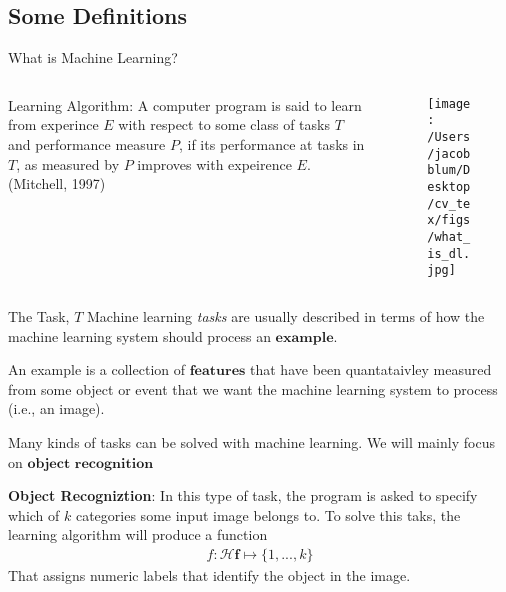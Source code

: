 \documentclass{beamer}
\begin{document}
\subsection{Some Definitions}
\begin{frame}[plain]{What is Machine Learning?}
    \begin{columns}
        \begin{column}{0.45\textwidth}
            \begin{definition}{Learning Algorithm:}
                A computer program is said to learn from experince $E$ with respect to some class of tasks $T$ and performance measure $P$, 
                if its performance at tasks in $T$, as measured by $P$ improves with expeirence $E$. (Mitchell, 1997)
            \end{definition}
            
        \end{column}
        \begin{column}{0.45\textwidth}  
            \begin{figure}
                \centering
                    \texttt{[image: /Users/jacobblum/Desktop/cv\_tex/figs/what\_is\_dl.jpg]}
                \end{figure}
        \end{column}
        \end{columns}
\end{frame}

\begin{frame}[plain]{The Task, $T$}
    Machine learning \textit{tasks} are usually described in terms of how the machine learning system should process an $\textbf{example}$. 
    
    \begin{definition}
    An example is a collection of $\textbf{features}$ that have been quantataivley measured from some object or event that we want the machine learning system to process (i.e., an image).
    \end{definition}
  
    Many kinds of tasks can be solved with machine learning. We will mainly focus on $\textbf{object recognition}$

    \begin{definition}
        \textbf{Object Recogniztion}: In this type of task, the program is asked to specify which of $k$ categories some input image belongs to. To solve this taks, the learning algorithm will produce
        a function
        \begin{align}
            f : \boldsymbol{\mathcal{H}}\mathbf{f} \mapsto \{1,...,k \}
        \end{align}
        That assigns numeric labels that identify the object in the image.
    \end{definition}
\end{frame}
\end{document}
